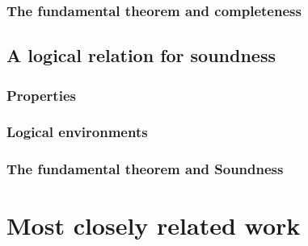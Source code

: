 \documentclass[sigplan,10pt,review]{acmart}\settopmatter{printfolios=true,printccs=false,printacmref=false}
\begin{document}
\subsubsection{The fundamental theorem and completeness}

\subsection{A logical relation for soundness}

\subsubsection{Properties}

\subsubsection{Logical environments}

\subsubsection{The fundamental theorem and Soundness}

\section{Most closely related work}



\end{document}
